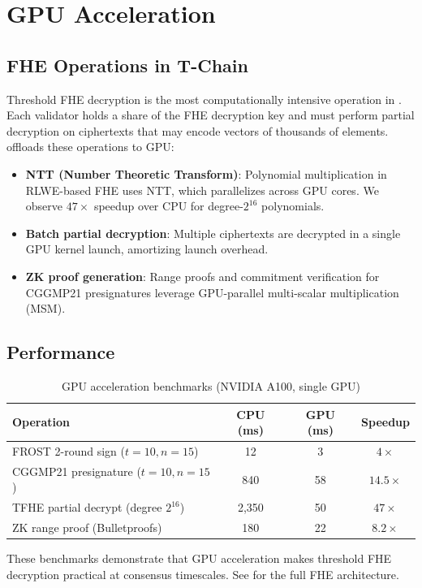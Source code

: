 \section{GPU Acceleration}

\label{sec:gpu}

\subsection{FHE Operations in T-Chain}

Threshold FHE decryption is the most computationally intensive operation in \TChain{}. Each validator holds a share of the FHE decryption key and must perform partial decryption on ciphertexts that may encode vectors of thousands of elements. \TChain{} offloads these operations to GPU:

\begin{itemize}
\item \textbf{NTT (Number Theoretic Transform)}: Polynomial multiplication in RLWE-based FHE uses NTT, which parallelizes across GPU cores. We observe $47\times$ speedup over CPU for degree-$2^{16}$ polynomials.
\item \textbf{Batch partial decryption}: Multiple ciphertexts are decrypted in a single GPU kernel launch, amortizing launch overhead.
\item \textbf{ZK proof generation}: Range proofs and commitment verification for CGGMP21 presignatures leverage GPU-parallel multi-scalar multiplication (MSM).
\end{itemize}

\subsection{Performance}

\begin{table}[h]
\centering
\begin{tabular}{lccc}
\toprule
\textbf{Operation} & \textbf{CPU (ms)} & \textbf{GPU (ms)} & \textbf{Speedup} \\
\midrule
FROST 2-round sign ($t{=}10, n{=}15$) & 12 & 3 & $4\times$ \\
CGGMP21 presignature ($t{=}10, n{=}15$) & 840 & 58 & $14.5\times$ \\
TFHE partial decrypt (degree $2^{16}$) & 2,350 & 50 & $47\times$ \\
ZK range proof (Bulletproofs) & 180 & 22 & $8.2\times$ \\
\bottomrule
\end{tabular}
\caption{GPU acceleration benchmarks (NVIDIA A100, single GPU)}
\label{tab:gpu}
\end{table}

These benchmarks demonstrate that GPU acceleration makes threshold FHE decryption practical at consensus timescales. See \cite{zoo-fhe} for the full FHE architecture.

